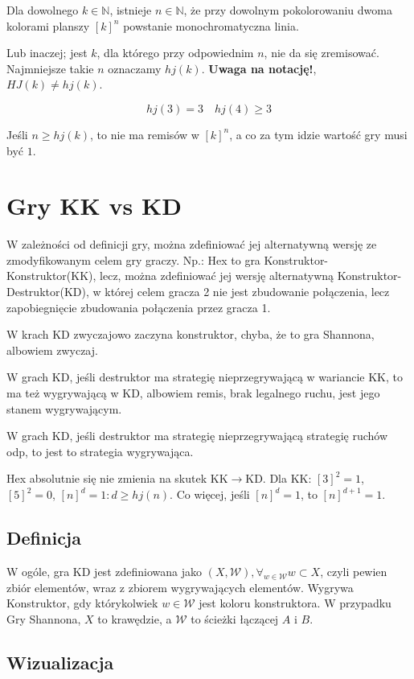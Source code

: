 \documentclass{../notatki}
\begin{document}
Dla dowolnego $k \in \mathbb{N}$, istnieje $n \in \mathbb{N}$, że przy dowolnym
pokolorowaniu dwoma kolorami planszy $[k]^n$ powstanie monochromatyczna linia.

Lub inaczej; jest $k$, dla którego przy odpowiednim $n$, nie da się
zremisować. Najmniejsze takie $n$ oznaczamy $hj(k)$.
\textbf{Uwaga na notację!}, $HJ(k) \neq hj(k)$.

$$
hj(3) = 3 \quad hj(4) \geq 3
$$

Jeśli $n \geq hj(k)$, to nie ma remisów w $[k]^n$, a co za tym idzie wartość
gry musi być $1$.

\section{Gry KK vs KD}

W zależności od definicji gry, można zdefiniować jej alternatywną wersję
ze zmodyfikowanym celem gry graczy. Np.: Hex to gra Konstruktor-Konstruktor(KK),
lecz, można zdefiniować jej wersję alternatywną
Konstruktor-Destruktor(KD), w której celem gracza 2 nie jest
zbudowanie połączenia, lecz zapobiegnięcie zbudowania połączenia przez gracza 1.

W krach KD zwyczajowo zaczyna konstruktor, chyba, że to gra Shannona, albowiem
zwyczaj.

W grach KD, jeśli destruktor ma strategię nieprzegrywającą w
wariancie KK, to ma też wygrywającą w KD, albowiem remis, brak
legalnego ruchu, jest jego stanem wygrywającym.

W grach KD, jeśli destruktor ma strategię nieprzegrywającą strategię ruchów
odp, to jest to strategia wygrywająca.

Hex absolutnie się nie zmienia na skutek KK$\to$KD. Dla KK: $[3]^2 =
1$, $[5]^2 = 0$, $[n]^d = 1 : d \geq hj(n)$. Co więcej, jeśli $[n]^d = 1$, to
$[n]^{d + 1} = 1$.

\subsection{Definicja}

W ogóle, gra KD jest zdefiniowana jako $(X, \mathcal{W}), \forall_{w
\in \mathcal{W}} w \subset X$, czyli pewien zbiór elementów, wraz z zbiorem
wygrywających elementów. Wygrywa Konstruktor, gdy którykolwiek $w \in
\mathcal{W}$ jest koloru konstruktora. W przypadku Gry Shannona, $X$
to krawędzie, a $\mathcal{W}$ to ścieżki łączącej $A$ i $B$.

\subsection{Wizualizacja}
\end{document}
